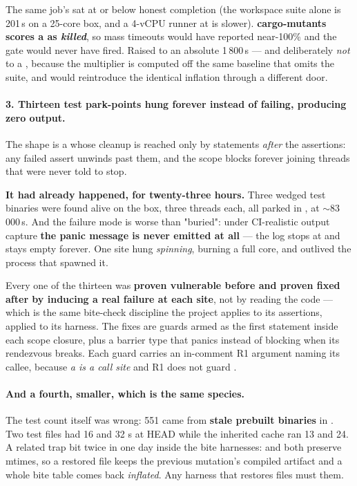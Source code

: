 \documentclass[10.5pt]{article}
\begin{document}
The same job's  sat at or below honest completion (the workspace suite alone
is 201\,s on a 25-core box, and a 4-vCPU runner at  is slower). \textbf{cargo-mutants
scores a  as \emph{killed}}, so mass timeouts would have reported near-100\% and the
gate would never have fired. Raised to an absolute 1\,800\,s — and deliberately \emph{not} to a
, because the multiplier is computed off the same baseline that omits
the suite, and would reintroduce the identical inflation through a different door.

\paragraph{3. Thirteen test park-points hung forever instead of failing, producing zero output.}
The shape is a  whose cleanup is reached only by statements \emph{after} the
assertions: any failed assert unwinds past them, and the scope blocks forever joining threads that
were never told to stop.

\begin{warnbox}\small
\textbf{It had already happened, for twenty-three hours.} Three wedged test binaries were found
alive on the box, three threads each, all parked in , at $\sim$83\,000\,s.
And the failure mode is worse than "buried": under CI-realistic output capture \textbf{the panic
message is never emitted at all} — the log stops at  and stays empty
forever. One site hung \emph{spinning}, burning a full core, and outlived the  process
that spawned it.
\end{warnbox}

Every one of the thirteen was \textbf{proven vulnerable before and proven fixed after by inducing
a real failure at each site}, not by reading the code — which is the same bite-check discipline
the project applies to its assertions, applied to its harness. The fixes are  guards
armed as the first statement inside each scope closure, plus a barrier type that panics instead of
blocking when its rendezvous breaks. Each guard carries an in-comment R1 argument naming its
callee, because \emph{a  is a call site} and R1 does not guard .

\paragraph{And a fourth, smaller, which is the same species.} The test count itself was wrong:
551 came from \textbf{stale prebuilt binaries} in . Two test files had 16 and 32
\code{\#[test]}s at HEAD while the inherited cache ran 13 and 24. A related trap bit twice in one
day inside the bite harnesses:  and  both preserve mtimes, so a
restored file keeps the previous mutation's compiled artifact and a whole bite table comes back
\emph{inflated}. Any harness that restores files must  them.
\end{document}
